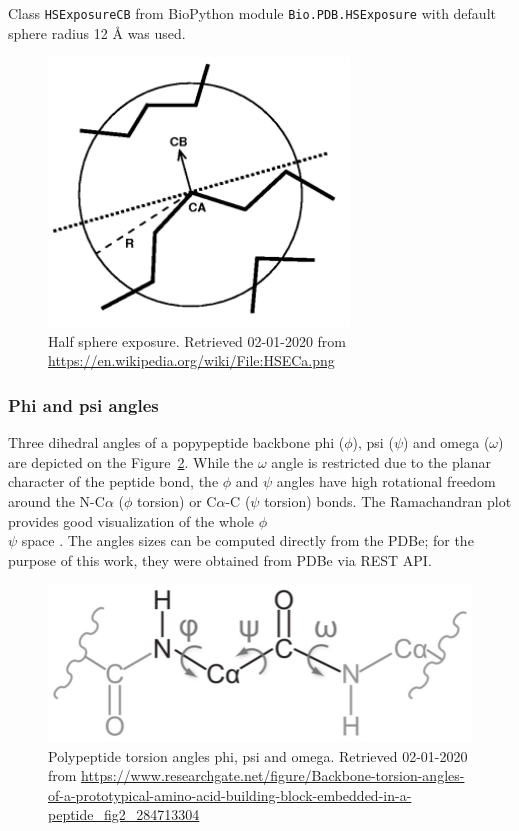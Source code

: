 Class \texttt{HSExposureCB} from BioPython module \texttt{Bio.PDB.HSExposure} with default sphere radius 12 {\AA} was used. 

\begin{figure}[!h]\centering
\includegraphics[width=80mm]{../img/hse.png}
\caption[Half sphere exposure]{Half sphere exposure. Retrieved 02-01-2020 from \url{https://en.wikipedia.org/wiki/File:HSECa.png}}
\label{fig:hse}
\end{figure}


\subsubsection{Phi and psi angles}

Three dihedral angles of a popypeptide backbone phi ($\phi$), psi ($\psi$) and omega ($\omega$) are depicted on the Figure~\ref{fig:torsion}. While the $\omega$ angle is restricted due to the planar character of the peptide bond, the $\phi$ and $\psi$ angles have high rotational freedom around the N-C$\alpha$ ($\phi$ torsion) or C$\alpha$-C ($\psi$ torsion) bonds. The Ramachandran plot provides good visualization of the whole $\phi$\\$\psi$ space \cite{ramachandran}.
The angles sizes can be computed directly from the PDBe; for the purpose of this work, they were obtained from PDBe via REST API.

\begin{figure}[!h]\centering
\includegraphics[width=120mm]{../img/torsion.png}
\caption[Polypeptide torsion angles phi, psi and omega]{Polypeptide torsion angles phi, psi and omega. Retrieved 02-01-2020 from \url{https://www.researchgate.net/figure/Backbone-torsion-angles-of-a-prototypical-amino-acid-building-block-embedded-in-a-peptide_fig2_284713304}}
\label{fig:torsion}
\end{figure}


